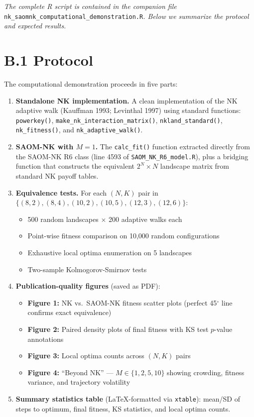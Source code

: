 \documentclass[12pt]{article}
\begin{document}
\noindent\textit{The complete R script is contained in the companion file}
\texttt{nk\_saomnk\_computational\_demonstration.R}\textit{. Below we
summarize the protocol and expected results.}

\section*{B.1 Protocol}

The computational demonstration proceeds in five parts:

\begin{enumerate}
  \item \textbf{Standalone NK implementation.} A clean implementation of
    the NK adaptive walk (Kauffman 1993; Levinthal 1997) using standard
    functions: \texttt{powerkey()}, \texttt{make\_nk\_interaction\_matrix()},
    \texttt{nkland\_standard()}, \texttt{nk\_fitness()}, and
    \texttt{nk\_adaptive\_walk()}.

  \item \textbf{SAOM-NK with $M=1$.} The \texttt{calc\_fit()} function
    extracted directly from the SAOM-NK R6 class (line 4593 of
    \texttt{SAOM\_NK\_R6\_model.R}), plus a bridging function that constructs
    the equivalent $2^N \times N$ landscape matrix from standard NK payoff
    tables.

  \item \textbf{Equivalence tests.} For each $(N,K)$ pair in
    $\{(8,2), (8,4), (10,2), (10,5), (12,3), (12,6)\}$:
    \begin{itemize}
      \item 500 random landscapes $\times$ 200 adaptive walks each
      \item Point-wise fitness comparison on 10{,}000 random configurations
      \item Exhaustive local optima enumeration on 5 landscapes
      \item Two-sample Kolmogorov-Smirnov tests
    \end{itemize}

  \item \textbf{Publication-quality figures} (saved as PDF):
    \begin{itemize}
      \item \textbf{Figure 1:} NK vs.\ SAOM-NK fitness scatter plots
            (perfect 45$^\circ$ line confirms exact equivalence)
      \item \textbf{Figure 2:} Paired density plots of final fitness with
            KS test $p$-value annotations
      \item \textbf{Figure 3:} Local optima counts across $(N,K)$ pairs
      \item \textbf{Figure 4:} ``Beyond NK'' --- $M \in \{1, 2, 5, 10\}$
            showing crowding, fitness variance, and trajectory volatility
    \end{itemize}

  \item \textbf{Summary statistics table} (LaTeX-formatted via
    \texttt{xtable}): mean/SD of steps to optimum, final fitness, KS
    statistics, and local optima counts.
\end{enumerate}
\end{document}
